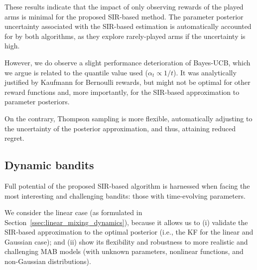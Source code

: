 \documentclass{article}
\newcommand{\ie}{i.e., }
\begin{document}
These results indicate that the impact of only observing rewards of the played arms is minimal for the proposed SIR-based method. The parameter posterior uncertainty associated with the SIR-based estimation is automatically accounted for by both algorithms, as they explore rarely-played arms if the uncertainty is high.

However, we do observe a slight performance deterioration of Bayes-UCB, which we argue is related to the quantile value used ($\alpha_t\propto1/t$). It was analytically justified by Kaufmann \cite{ip-Kaufmann2012} for Bernoulli rewards, but might not be optimal for other reward functions and, more importantly, for the SIR-based approximation to parameter posteriors.

On the contrary, Thompson sampling is more flexible, automatically adjusting to the uncertainty of the posterior approximation, and thus, attaining reduced regret.

\subsection{Dynamic bandits}
\label{ssec:dynamic_bandits}

Full potential of the proposed SIR-based algorithm is harnessed when facing the most interesting and challenging bandits: those with time-evolving parameters.

We consider the linear case (as formulated in Section~\ref{ssec:linear_mixing_dynamics}), because it allows us to (i) validate the SIR-based approximation to the optimal posterior (\ie the KF for the linear and Gaussian case); and (ii) show its flexibility and robustness to more realistic and challenging MAB models (with unknown parameters, nonlinear functions, and non-Gaussian distributions). 
\end{document}
